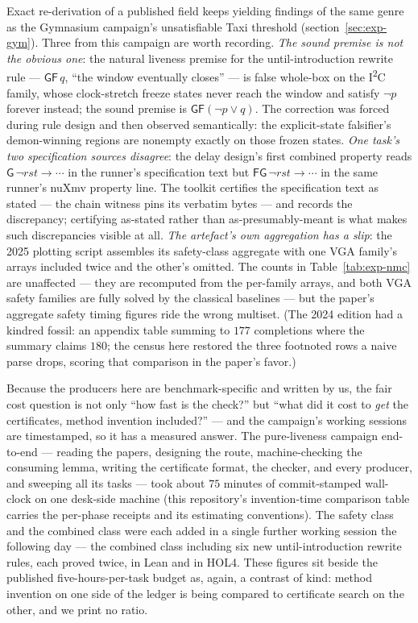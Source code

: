 Exact re-derivation of a published field keeps yielding findings of
the same genre as the Gymnasium campaign's unsatisfiable Taxi
threshold (section~\ref{sec:exp-gym}). Three from this campaign are
worth recording. \emph{The sound premise is not the obvious one}: the
natural liveness premise for the until-introduction rewrite rule ---
$\mathsf{GF}\,q$, ``the window eventually closes'' --- is false
whole-box on the I\textsuperscript{2}C family, whose clock-stretch
freeze states never reach the window and satisfy $\lnot p$ forever
instead; the sound premise is $\mathsf{GF}(\lnot p \lor q)$. The
correction was forced during rule design and then observed
semantically: the explicit-state falsifier's demon-winning regions are
nonempty exactly on those frozen states. \emph{One task's two
specification sources disagree}: the delay design's first combined
property reads $\mathsf{G}\,\lnot\mathit{rst} \to \cdots$ in the
runner's specification text but $\mathsf{FG}\,\lnot\mathit{rst} \to
\cdots$ in the same runner's nuXmv property line. The toolkit
certifies the specification text as stated --- the chain witness pins
its verbatim bytes --- and records the discrepancy; certifying
as-stated rather than as-presumably-meant is what makes such
discrepancies visible at all. \emph{The artefact's own aggregation
has a slip}: the 2025 plotting script assembles its safety-class
aggregate with one VGA family's arrays included twice and the other's
omitted. The counts in Table~\ref{tab:exp-nmc} are unaffected ---
they are recomputed from the per-family arrays, and both VGA safety
families are fully solved by the classical baselines --- but the
paper's aggregate safety timing figures ride the wrong multiset. (The
2024 edition had a kindred fossil: an appendix table summing to $177$
completions where the summary claims $180$; the census here restored
the three footnoted rows a naive parse drops, scoring that comparison
in the paper's favor.)

Because the producers here are benchmark-specific and written by us,
the fair cost question is not only ``how fast is the check?'' but
``what did it cost to \emph{get} the certificates, method invention
included?'' --- and the campaign's working sessions are timestamped,
so it has a measured answer. The pure-liveness campaign end-to-end ---
reading the papers, designing the route, machine-checking the
consuming lemma, writing the certificate format, the checker, and
every producer, and sweeping all its tasks --- took about $75$ minutes
of commit-stamped wall-clock on one desk-side machine (this
repository's invention-time comparison table carries the per-phase
receipts and its estimating conventions). The safety class and the
combined class were each added in a single further working session the
following day --- the combined class including six new
until-introduction rewrite rules, each proved twice, in Lean and in
HOL4. These figures sit beside the published five-hours-per-task
budget as, again, a contrast of kind: method invention on one side of
the ledger is being compared to certificate search on the other, and
we print no ratio.

